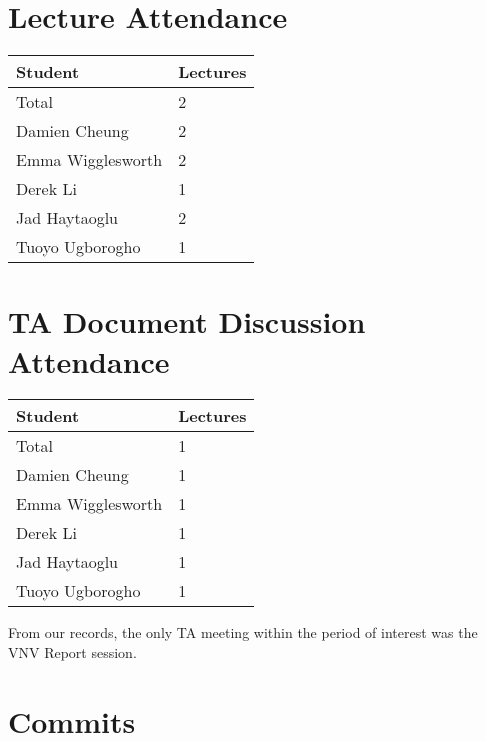 \documentclass{article}
\begin{document}
\section{Lecture Attendance}


\begin{table}[H]
\centering
\begin{tabular}{ll}
\toprule
\textbf{Student} & \textbf{Lectures}\\
\midrule
Total & 2\\
Damien Cheung & 2\\
Emma Wigglesworth & 2\\
Derek Li & 1\\
Jad Haytaoglu & 2\\
Tuoyo Ugborogho & 1\\
\bottomrule
\end{tabular}
\end{table}

\section{TA Document Discussion Attendance}


\begin{table}[H]
\centering
\begin{tabular}{ll}
\toprule
\textbf{Student} & \textbf{Lectures}\\
\midrule
Total & 1\\
Damien Cheung & 1\\
Emma Wigglesworth & 1\\
Derek Li & 1\\
Jad Haytaoglu & 1\\
Tuoyo Ugborogho & 1\\
\bottomrule
\end{tabular}
\end{table}

From our records, the only TA meeting within the period of interest was the VNV Report session.

\section{Commits}
\end{document}
